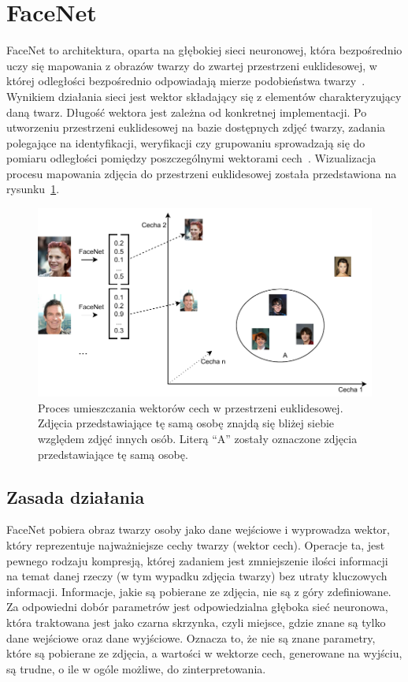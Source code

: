\section{FaceNet}

FaceNet to architektura, oparta na głębokiej sieci neuronowej, która bezpośrednio uczy się mapowania
z obrazów twarzy do zwartej przestrzeni euklidesowej,
w której odległości bezpośrednio odpowiadają mierze podobieństwa twarzy~\cite{schroff2015facenet}.
Wynikiem działania sieci jest wektor składający się z elementów charakteryzujący daną twarz.
Długość wektora jest zależna od konkretnej implementacji.
Po utworzeniu przestrzeni euklidesowej na bazie dostępnych zdjęć twarzy,
zadania polegające na identyfikacji, weryfikacji czy grupowaniu
sprowadzają się do pomiaru odległości pomiędzy poszczególnymi wektorami cech~\cite{schroff2015facenet}.
Wizualizacja procesu mapowania zdjęcia do przestrzeni
euklidesowej została przedstawiona na rysunku~\ref{fig:facenet_zastosowanie}.

\begin{figure}[]
    \centering
    \includegraphics[width=1\textwidth]{images/facenet_euc}
    \caption{
        Proces umieszczania wektorów cech w przestrzeni euklidesowej.
        Zdjęcia przedstawiające tę samą osobę znajdą się bliżej siebie względem zdjęć innych osób.
        Literą ``A'' zostały oznaczone zdjęcia przedstawiające tę samą osobę.
    }
    \customsource
    \label{fig:facenet_zastosowanie}
\end{figure}

\subsection{Zasada działania}

FaceNet pobiera obraz twarzy osoby jako dane wejściowe i wyprowadza wektor,
który reprezentuje najważniejsze cechy twarzy (wektor cech).
Operacje ta, jest pewnego rodzaju kompresją, której zadaniem jest zmniejszenie ilości informacji
na temat danej rzeczy (w tym wypadku zdjęcia twarzy) bez utraty kluczowych informacji.
Informacje, jakie są pobierane ze zdjęcia, nie są z góry zdefiniowane.
Za odpowiedni dobór parametrów jest odpowiedzialna głęboka sieć neuronowa, która traktowana jest
jako czarna skrzynka, czyli miejsce, gdzie znane są tylko dane wejściowe oraz dane wyjściowe.
Oznacza to, że nie są znane parametry, które są pobierane ze zdjęcia, a wartości w wektorze cech,
generowane na wyjściu, są trudne, o ile w ogóle możliwe, do zinterpretowania.

